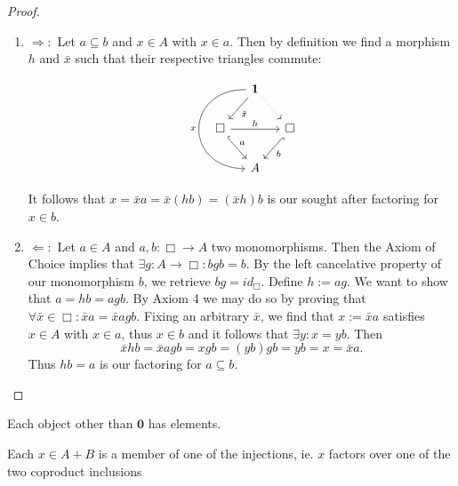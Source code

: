 \begin{proof}
\begin{enumerate} 
\item $\Rightarrow :$ Let $a \subseteq b$ and $x \in A$ with $x \in a$. Then by definition we find a morphism $h$ and $\bar{x}$ such that their respective triangles commute:

\begin{equation}
\begin{tikzcd}[column sep=small]
& \mathbf{1} \arrow[dl, "\bar{x}"] \arrow[dr, dotted] \arrow[dd, "x", bend right=90,looseness=2,swap]& \\
\Box \arrow[rr, "h"] \arrow[dr, "a", hook] &     & \Box \arrow[dl, "b", hook] \\
& A
\end{tikzcd}
\end{equation} \newline

It follows that $x = \bar{x}a = \bar{x}(hb) = (\bar{x}h)b$ is our sought after factoring for $x \in b$.

\item $\Leftarrow :$ Let $a \in A$ and $a,b: \Box \longrightarrow A$ two monomorphisms. Then the Axiom of Choice implies that $\exists g: A \longrightarrow \Box : bgb = b$. By the left cancelative property of our monomorphism $b$, we retrieve $bg = id_\Box$. Define $h := ag$. We want to show that $a = hb = agb$. By Axiom 4 we may do so by proving that $\forall \bar{x} \in \Box: \bar{x}a = \bar{x}agb$. Fixing an arbitrary $\bar{x}$, we find that $x := \bar{x}a$ satisfies $x \in A$ with $x \in a$, thus $x \in b$ and it follows that $\exists y : x = yb$. Then
\begin{equation*}
\bar{x}hb = \bar{x}agb = xgb = (yb)gb = yb = x = \bar{x}a.
\end{equation*}
Thus $hb = a$ is our factoring for $a \subseteq b$. 
\end{enumerate}
\end{proof}


\begin{axiom}
Each object other than $\mathbf{0}$ has elements.
\end{axiom}

\begin{axiom}
Each $x \in A + B$ is a member of one of the injections, ie. $x$ factors over one of the two coproduct inclusions
\end{axiom}

